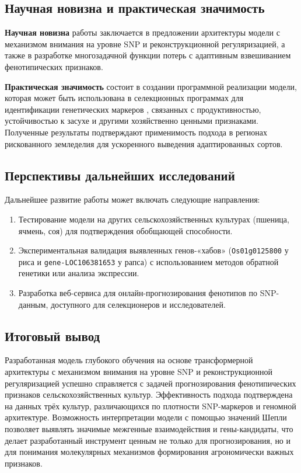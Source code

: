 \subsection*{Научная новизна и практическая значимость}

\textbf{Научная новизна} работы заключается в предложении архитектуры 
модели с механизмом внимания на уровне SNP и реконструкционной 
регуляризацией, а также в разработке многозадачной функции потерь 
с адаптивным взвешиванием фенотипических признаков.

\textbf{Практическая значимость} состоит в создании программной 
реализации модели, которая может быть использована в селекционных 
программах для идентификации генетических маркеров \cite{Atieno2017, Bankin2024}, связанных с 
продуктивностью, устойчивостью к засухе и другими хозяйственно 
ценными признаками. Полученные результаты подтверждают применимость 
подхода в регионах рискованного земледелия для ускоренного выведения 
адаптированных сортов.

\subsection*{Перспективы дальнейших исследований}

Дальнейшее развитие работы может включать следующие направления:

\begin{enumerate}
	\item Тестирование модели на других сельскохозяйственных культурах 
	(пшеница, ячмень, соя) для подтверждения обобщающей способности.
	
	\item Экспериментальная валидация выявленных генов-«хабов» 
	(\texttt{Os01g0125800} у риса и \texttt{gene-LOC106381653} у рапса) 
	с использованием методов обратной генетики или анализа экспрессии.
	
	\item Разработка веб-сервиса для онлайн-прогнозирования фенотипов 
	по SNP-данным, доступного для селекционеров и исследователей.
	

\end{enumerate}

\subsection*{Итоговый вывод}

Разработанная модель глубокого обучения на основе трансформерной 
архитектуры с механизмом внимания на уровне SNP и реконструкционной 
регуляризацией успешно справляется с задачей прогнозирования 
фенотипических признаков сельскохозяйственных культур. Эффективность 
подхода подтверждена на данных трёх культур, различающихся по 
плотности SNP-маркеров и геномной архитектуре. Возможность 
интерпретации модели с помощью значений Шепли позволяет выявлять 
значимые межгенные взаимодействия и гены-кандидаты, что делает 
разработанный инструмент ценным не только для прогнозирования, 
но и для понимания молекулярных механизмов формирования 
агрономически важных признаков.


